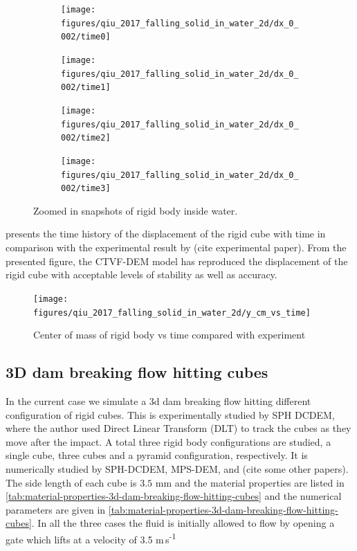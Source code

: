 \documentclass[preprint,12pt]{elsarticle}
\begin{document}
\begin{figure}[!htpb]
  \centering
  \begin{subfigure}{0.48\textwidth}
    \centering
    \texttt{[image: figures/qiu\_2017\_falling\_solid\_in\_water\_2d/dx\_0\_002/time0]}
  \end{subfigure}
  \begin{subfigure}{0.48\textwidth}
    \centering
    \texttt{[image: figures/qiu\_2017\_falling\_solid\_in\_water\_2d/dx\_0\_002/time1]}
  \end{subfigure}

  \begin{subfigure}{0.48\textwidth}
    \centering
    \texttt{[image: figures/qiu\_2017\_falling\_solid\_in\_water\_2d/dx\_0\_002/time2]}
  \end{subfigure}
  \begin{subfigure}{0.48\textwidth}
    \centering
    \texttt{[image: figures/qiu\_2017\_falling\_solid\_in\_water\_2d/dx\_0\_002/time3]}
  \end{subfigure}
  \caption{Zoomed in snapshots of rigid body inside water.}
\label{fig:snapshots-falling-solid-in-water-zoomed}
\end{figure}

 presents the time history of the
displacement of the rigid cube with time in comparison with the experimental
result by (cite experimental paper). From the presented figure, the CTVF-DEM
model has reproduced the displacement of the rigid cube with acceptable levels
of stability as well as accuracy.
\begin{figure}[!htpb]
  \centering
  \texttt{[image: figures/qiu\_2017\_falling\_solid\_in\_water\_2d/y\_cm\_vs\_time]}
  \caption{Center of mass of rigid body vs time compared with experiment}
\label{fig:disp-falling-solid-in-water}
\end{figure}


\FloatBarrier%
\subsection{3D dam breaking flow hitting cubes}

\cite{amaro2019improvement}

In the current case we simulate a 3d dam breaking flow hitting different
configuration of rigid cubes. This is experimentally studied by SPH DCDEM,
where the author used Direct Linear Transform (DLT) to track the cubes as they
move after the impact. A total three rigid body configurations are studied, a
single cube, three cubes and a pyramid configuration, respectively. It is
numerically studied by SPH-DCDEM, MPS-DEM, and (cite some other papers). The
side length of each cube is $3.5$ mm and the material properties are listed in
\cref{tab:material-properties-3d-dam-breaking-flow-hitting-cubes} and the
numerical parameters are given in
\cref{tab:material-properties-3d-dam-breaking-flow-hitting-cubes}. In all the
three cases the fluid is initially allowed to flow by opening a gate which
lifts at a velocity of 3.5 m\,s\textsuperscript{-1}
\end{document}
